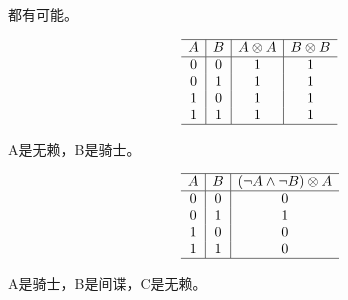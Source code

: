 {{        %
        \begin{practices}
            都有可能。

            \begin{table}[H]
                \[
                    \begin{array}{c|c|c|c}
                        \hline
                        A & B & A \otimes A & B \otimes B \\
                        \hline
                        0 & 0 & 1 & 1 \\
                        0 & 1 & 1 & 1 \\
                        1 & 0 & 1 & 1 \\
                        1 & 1 & 1 & 1 \\
                        \hline
                   \end{array}
               \]
            \end{table}
        \end{practices}

        \begin{practices}
            A是无赖，B是骑士。

            \begin{table}[H]
                \[
                    \begin{array}{c|c|c}
                        \hline
                        A & B & (\neg A \wedge \neg B) \otimes A \\
                        \hline
                        0 & 0 & 0 \\
                        0 & 1 & 1 \\
                        1 & 0 & 0 \\
                        1 & 1 & 0 \\
                        \hline
                   \end{array}
               \]
            \end{table}
        \end{practices}

        \begin{practices}
            A是骑士，B是间谍，C是无赖。


\end{practices}}}
